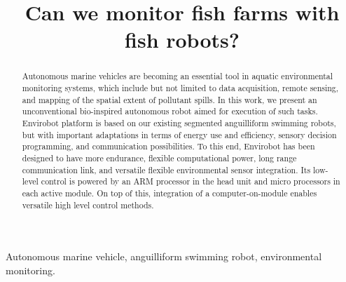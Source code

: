 


\title{\LARGE \bf
Can we monitor fish farms with fish robots?}

\author{
}

\graphicspath {{figs/}}





\maketitle
\thispagestyle{empty}
\pagestyle{empty}


\begin{abstract}
	
Autonomous marine vehicles are becoming an essential tool in aquatic environmental monitoring systems, which include but not limited to data acquisition, remote sensing, and mapping
of the spatial extent of pollutant spills. In this work, we present  an unconventional bio-inspired autonomous robot aimed for execution of such tasks. Envirobot platform is based on our existing segmented    
anguilliform swimming robots, but with important adaptations in terms of energy use and efficiency, sensory decision
programming, and communication possibilities. To this end,
Envirobot has been designed to have more endurance, flexible
computational power, long range communication link, and
versatile flexible environmental sensor integration. Its low-level control is powered by an ARM processor in the head unit
and micro processors in each active module. On top of this,
integration of a computer-on-module enables versatile
high level control methods.

	
\end{abstract}

\begin{IEEEkeywords}
Autonomous marine vehicle, anguilliform swimming robot, environmental monitoring.
\end{IEEEkeywords}

